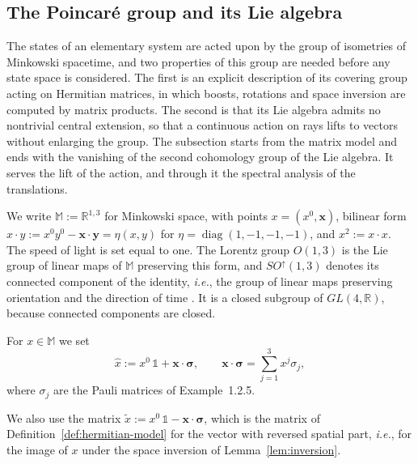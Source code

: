 \subsection{The Poincar\'e group and its Lie algebra}
\label{sec:poincare-group}

The states of an elementary system are acted upon by the group of isometries of Minkowski spacetime, and two properties of this group are needed before any state space is considered. The first is an explicit description of its covering group acting on Hermitian matrices, in which boosts, rotations and space inversion are computed by matrix products. The second is that its Lie algebra admits no nontrivial central extension, so that a continuous action on rays lifts to vectors without enlarging the group. The subsection starts from the matrix model and ends with the vanishing of the second cohomology group of the Lie algebra. It serves the lift of the action, and through it the spectral analysis of the translations.

We write $\mathbb{M}:=\mathbb{R}^{1,3}$ for Minkowski space, with points $x=(x^0,\mathbf{x})$, bilinear form $x\cdot y:=x^0y^0-\mathbf{x}\cdot\mathbf{y}=\eta(x,y)$ for $\eta=\operatorname{diag}(1,-1,-1,-1)$, and $x^2:=x\cdot x$. The speed of light is set equal to one. The Lorentz group $O(1,3)$ is the Lie group of linear maps of $\mathbb{M}$ preserving this form, and $SO^\uparrow(1,3)$ denotes its connected component of the identity, \textit{i.e.}, the group of linear maps preserving orientation and the direction of time \cite[TODO-location]{TODO-BarutRaczka}. It is a closed subgroup of $GL(4,\mathbb{R})$, because connected components are closed.

\begin{definition}\label{def:hermitian-model}
	For $x\in\mathbb{M}$ we set
	\begin{equation}\label{eq:hermitian-map}
		\hat{x}:=x^0\,\mathbb{1}+\mathbf{x}\cdot\boldsymbol{\sigma}, \qquad \mathbf{x}\cdot\boldsymbol{\sigma}=\sum_{j=1}^3x^j\sigma_j,
	\end{equation}
	where $\sigma_j$ are the Pauli matrices of Example~1.2.5.
\end{definition}

\begin{remark}
	We also use the matrix $\tilde{x}:=x^0\,\mathbb{1}-\mathbf{x}\cdot\boldsymbol{\sigma}$, which is the matrix of Definition~\ref{def:hermitian-model} for the vector with reversed spatial part, \textit{i.e.}, for the image of $x$ under the space inversion of Lemma~\ref{lem:inversion}.
\end{remark}

